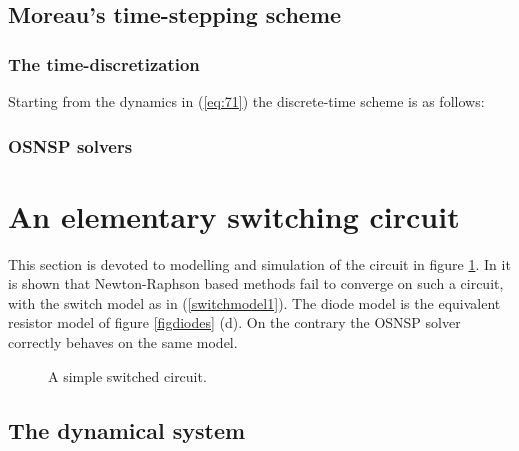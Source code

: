 \documentclass{article}
\begin{document}
\subsection{Moreau's time-stepping scheme}
\label{section24}



\subsubsection{The time-discretization}

Starting from the dynamics in (\ref{eq:71}) the discrete-time scheme is as follows:


\subsubsection{OSNSP solvers}







\section{An elementary switching circuit}
\label{section3}


This section is devoted to modelling and simulation of the circuit in figure \ref{fig:figcircuit1}. In \cite{maffezzoni2006} it is shown that Newton-Raphson based methods fail to converge on such a circuit, with the switch model as in (\ref{switchmodel1}). The diode model is the equivalent resistor model of figure \ref{figdiodes} (d). On the contrary the OSNSP solver correctly behaves on the same model.  

\begin{figure}[h]
  \centering
   \scalebox{0.9}{
  
  }
  \caption{A simple switched circuit.}
  \label{fig:figcircuit1}
\end{figure}

\subsection{The dynamical system}
\label{section31}
\end{document}
